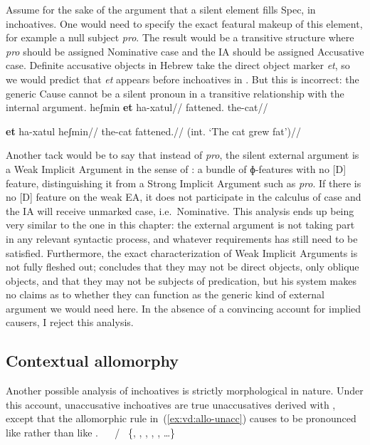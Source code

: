 Assume for the sake of the argument that a silent element fills Spec,{\vd} in inchoatives. One would need to specify the exact featural makeup of this element, for example a null subject \emph{pro}. The result would be a transitive structure where \emph{pro} should be assigned Nominative case and the IA should be assigned Accusative case. Definite accusative objects in Hebrew take the direct object marker \emph{et}, so we would predict that \emph{et} appears before inchoatives in \thif. But this is incorrect: the generic Cause cannot be a silent pronoun in a transitive relationship with the internal argument.
\pex
	\a \ljudge{*} \begingl
		\gla heʃmin \textbf{et} ha-xatul//
		\glb fattened.  the-cat//
	\endgl
	
	\a \ljudge{*} \begingl
		\gla \textbf{et} ha-xatul heʃmin//
		\glb {} the-cat fattened.//
		\glft (int. `The cat grew fat')//
	\endgl
\xe

Another tack would be to say that instead of \emph{pro}, the silent external argument is a Weak Implicit Argument in the sense of \cite{landau10}: a bundle of ɸ-features with no [D] feature, distinguishing it from a Strong Implicit Argument such as \emph{pro}. If there is no [D] feature on the weak EA, it does not participate in the calculus of case and the IA will receive unmarked case, i.e.~Nominative. This analysis ends up being very similar to the one in this chapter: the external argument is not taking part in any relevant syntactic process, and whatever requirements {\vd} has still need to be satisfied. Furthermore, the exact characterization of Weak Implicit Arguments is not fully fleshed out; \citet[380]{landau10} concludes that they may not be direct objects, only oblique objects, and that they may not be subjects of predication, but his system makes no claims as to whether they can function as the generic kind of external argument we would need here. In the absence of a convincing account for implied causers, I reject this analysis.

	\subsection{Contextual allomorphy}
Another possible analysis of inchoatives is strictly morphological in nature. Under this account, unaccusative inchoatives are true unaccusatives derived with {\vz}, except that the allomorphic rule in~(\ref{ex:vd:allo-unacc}) causes {\vz} to be pronounced like {\thit} rather than like {\tnif}.
\pex
  \a \vz~\lra~ / \trace~\{, , , , , \dots \}\label{ex:vd:allo-unacc}
  \a \vz~\lra~
\xe

